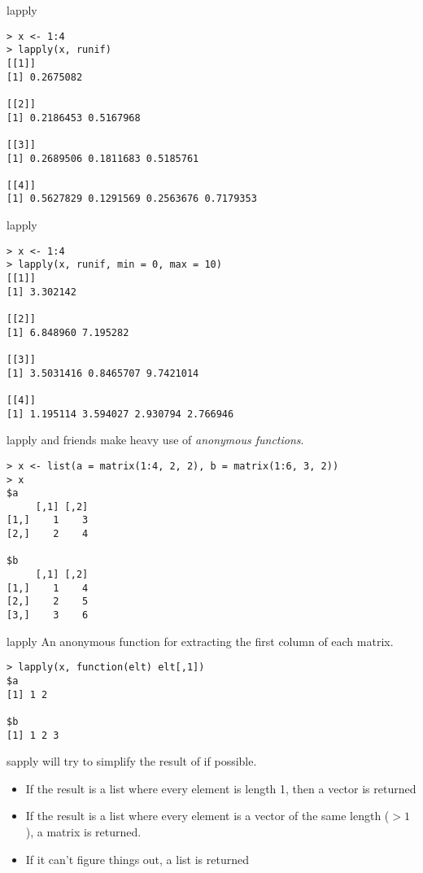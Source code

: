 \documentclass[aspectratio=169]{beamer}
\begin{document}
\begin{frame}[fragile]{lapply}
\begin{verbatim}
> x <- 1:4
> lapply(x, runif)
[[1]]
[1] 0.2675082

[[2]]
[1] 0.2186453 0.5167968

[[3]]
[1] 0.2689506 0.1811683 0.5185761

[[4]]
[1] 0.5627829 0.1291569 0.2563676 0.7179353
\end{verbatim}
\end{frame}

\begin{frame}[fragile]{lapply}
\begin{verbatim}
> x <- 1:4
> lapply(x, runif, min = 0, max = 10)
[[1]]
[1] 3.302142

[[2]]
[1] 6.848960 7.195282

[[3]]
[1] 3.5031416 0.8465707 9.7421014

[[4]]
[1] 1.195114 3.594027 2.930794 2.766946
\end{verbatim}
\end{frame}


\begin{frame}[fragile]{lapply}
 and friends make heavy use of \textit{anonymous functions}.
\begin{verbatim}
> x <- list(a = matrix(1:4, 2, 2), b = matrix(1:6, 3, 2))
> x
$a
     [,1] [,2]
[1,]    1    3
[2,]    2    4

$b
     [,1] [,2]
[1,]    1    4
[2,]    2    5
[3,]    3    6
\end{verbatim}
\end{frame}


\begin{frame}[fragile]{lapply}
An anonymous function for extracting the first column of each matrix.
\begin{verbatim}
> lapply(x, function(elt) elt[,1])
$a
[1] 1 2

$b
[1] 1 2 3
\end{verbatim}
\end{frame}


\begin{frame}[fragile]{sapply}
 will try to simplify the result of  if
possible.
\begin{itemize}
\item
If the result is a list where every element is length 1, then a vector
is returned
\item
If the result is a list where every element is a vector of the same
length ($> 1$), a matrix is returned.
\item
If it can't figure things out, a list is returned
\end{itemize}
\end{frame}
\end{document}
